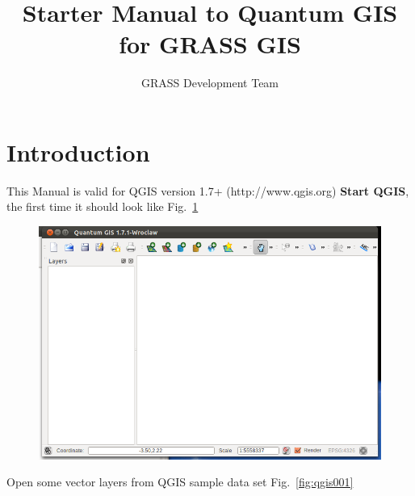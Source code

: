 %


\title{Starter Manual to Quantum GIS for GRASS GIS}
\subtitle{}
\author{GRASS Development Team}

\maketitle

\section{Introduction}

This Manual is valid for QGIS version 1.7+ (http://www.qgis.org)
\textbf{Start QGIS}, the first time it should look like Fig.~\ref{fig:qgis000}

\begin{figure}[htbp]
   \centering
   \includegraphics[scale=0.35]{qgis000.png}
   \caption{}
   \label{fig:qgis000}
\end{figure}

Open some vector layers from QGIS sample data set Fig.~\ref{fig:qgis001}

